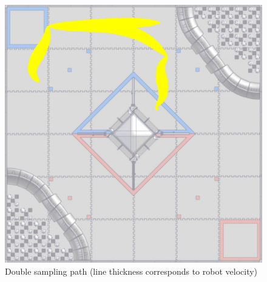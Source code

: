 \documentclass{article}
\begin{document}
\begin{figure}
    \centering
    \includegraphics[width=.6\textwidth]{22_01-28/images/double.png}
    \caption{Double sampling path (line thickness corresponds to robot velocity)}
    \label{fig:double}
\end{figure}
\end{document}
